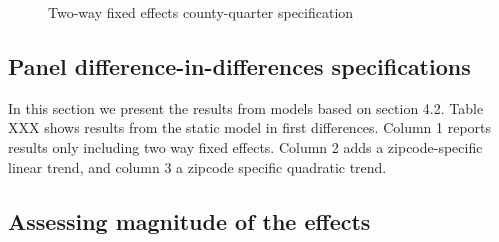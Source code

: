 \begin{figure}[h!]
    \centering
    \caption{Two-way fixed effects county-quarter specification}
    \label{fig:event_level_county2way}
\end{figure}

\subsection{Panel difference-in-differences specifications}\label{subsec:results/first-differences}

In this section we present the results from models based on section 4.2. Table XXX shows results from the static model in first differences. Column 1 reports results only including two way fixed effects. Column 2 adds a zipcode-specific linear trend, and column 3 a zipcode specific quadratic trend. 




\subsection{Assessing magnitude of the effects}\label{subsec:results/magnitude}


